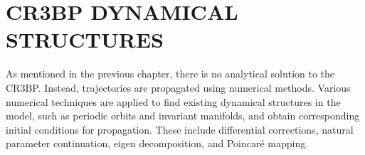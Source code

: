 \chapter{CR3BP DYNAMICAL STRUCTURES}

As mentioned in the previous chapter, there is no analytical solution to the CR3BP. Instead,
trajectories are propagated using numerical methods. Various numerical techniques are applied to
find existing dynamical structures in the model, such as periodic orbits and invariant manifolds,
and obtain corresponding initial conditions for propagation. These include differential
corrections, natural parameter continuation, eigen decomposition, and Poincar\'e mapping.





